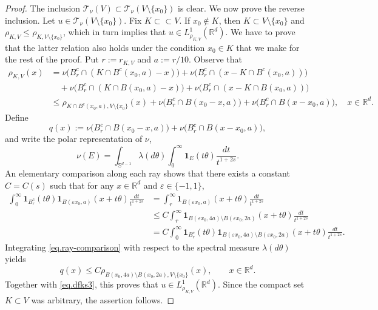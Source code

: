 \documentclass[11pt,a4paper,reqno]{amsart}
\theoremstyle{definition}
\numberwithin{equation}{section}
\begin{document}
\begin{proof}
The inclusion $\mathscr T_\nu(V)\subset \mathscr T_\nu(V\setminus\{x_0\})$ is clear.
We now prove the reverse inclusion. Let $u\in\mathscr T_\nu(V\setminus\{x_0\})$.
Fix $K\subset\subset V$. If $x_0\notin K$, then $K\subset V\setminus \{x_0\}$
and $\rho_{K,V}\le \rho_{K,V\setminus\{x_0\}}$, which in turn implies that $u\in L^1_{\rho_{K,V}}(\mathbb R^d)$.
We have to prove that the latter relation also holds under the condition  $x_0\in K$ that we make for the rest of the proof. 
Put $r:=r_{K,V}$ and  $a:= r/10$.
Observe that
\begin{equation}
\label{eq.dfks3}
\begin{split}
\rho_{K,V}(x)&=\nu\bigl(B_r^c\cap(K\cap B^c(x_0,a)-x)\bigr)
+\nu\bigl(B_r^c\cap(x-K\cap B^c(x_0,a))\bigr)\\&\quad+
\nu\bigl(B_r^c\cap(K\cap B(x_0,a)-x)\bigr)
+\nu\bigl(B_r^c\cap(x-K\cap B(x_0,a))\bigr)
\\& \le \rho_{K\cap B^c(x_0,a),V\setminus\{x_0\}}(x)+
\nu\bigl(B_r^c\cap B(x_0-x,a)\bigr)
+\nu\bigl(B_r^c\cap B(x-x_0,a)\bigr),
\quad x\in\mathbb R^d.
\end{split}
\end{equation}
Define
\[
q(x)
:=
\nu\bigl(B_r^c\cap B(x_0-x,a)\bigr)
+\nu\bigl(B_r^c\cap B(x-x_0,a)\bigr),
\]
and write the polar representation of $\nu$,
\[
\nu(E)
=
\int_{\mathbb S^{d-1}}\lambda(d\theta)
\int_0^\infty
\mathbf1_E(t\theta)\frac{dt}{t^{1+2s}}.
\]
An elementary comparison along each ray shows that there exists a constant \(C=C(s)\) such that
for any $x\in\mathbb R^d$ and $\varepsilon\in \{-1,1\}$,
\begin{equation}
\label{eq.ray-comparison}
\begin{split}
\int_0^\infty
\mathbf1_{B_r^c}(t\theta)\mathbf1_{B(\varepsilon x_0,a)}(x+ t\theta)
\frac{dt}{t^{1+2s}}
&=\int_r^\infty\mathbf1_{B(\varepsilon x_0,a)}(x+ t\theta)
\frac{dt}{t^{1+2s}}
\\&\le
C
\int_r^\infty
\mathbf1_{B(\varepsilon x_0,4a)\setminus B(\varepsilon x_0,2a)}(x+t\theta)
\frac{dt}{t^{1+2s}}\\&=C
\int_0^\infty
\mathbf1_{B_r^c}(t\theta)\mathbf1_{B(\varepsilon x_0,4a)\setminus B(\varepsilon x_0,2a)}(x+t\theta)
\frac{dt}{t^{1+2s}}.
\end{split}
\end{equation}
Integrating \eqref{eq.ray-comparison} with respect to the spectral measure 
$\lambda(d\theta)$ yields
\[
q(x)\le C\rho_{B(x_0,4a)\setminus B(x_0,2a),V\setminus\{x_0\}}(x),
\qquad x\in\mathbb R^d.
\]
Together with \eqref{eq.dfks3}, this proves that \(u\in L^1_{\rho_{K,V}}(\mathbb R^d)\). 
Since the compact set \(K\subset V\) was arbitrary, the assertion follows.
\end{proof}
\end{document}
